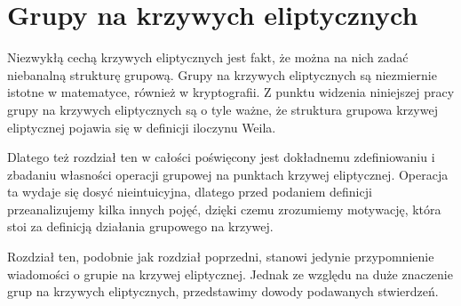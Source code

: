 \chapter{Grupy na krzywych eliptycznych}

Niezwykłą cechą krzywych eliptycznych jest fakt,
że można na nich zadać niebanalną strukturę grupową.
Grupy na krzywych eliptycznych
są niezmiernie istotne w matematyce,
również w kryptografii.
Z punktu widzenia niniejszej pracy
grupy na krzywych eliptycznych są o tyle ważne,
że struktura grupowa krzywej eliptycznej
pojawia się w definicji iloczynu Weila.

Dlatego też rozdział ten w całości poświęcony jest
dokładnemu zdefiniowaniu i zbadaniu własności
operacji grupowej na punktach krzywej eliptycznej.
Operacja ta wydaje się dosyć nieintuicyjna,
dlatego przed podaniem definicji
przeanalizujemy kilka innych pojęć,
dzięki czemu zrozumiemy motywację,
która stoi za definicją działania grupowego na krzywej.

Rozdział ten, podobnie jak rozdział poprzedni,
stanowi jedynie przypomnienie wiadomości
o grupie na krzywej eliptycznej.
Jednak ze względu na duże znaczenie grup na krzywych eliptycznych,
przedstawimy dowody podawanych stwierdzeń.








